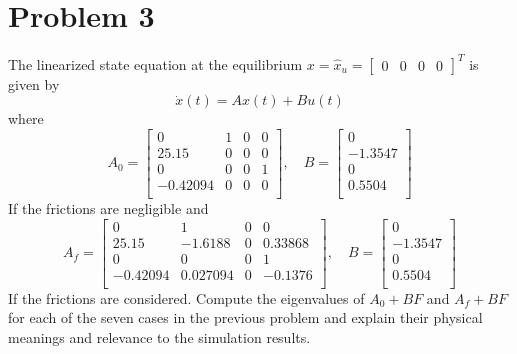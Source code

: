 \documentclass{article}
\begin{document}
\section*{Problem 3}
The linearized state equation at the equilibrium $ x = \hat{x}_u = \begin{bmatrix} 0 & 0 & 0 & 0 \end{bmatrix}^T$ is given by
$$ \dot{x}(t) = Ax(t) + Bu(t) $$
where
$$
A_0 =
\begin{bmatrix}
0 & 1 & 0 & 0 \\
25.15 & 0 & 0 & 0 \\
0 & 0 & 0 & 1 \\
-0.42094 & 0 & 0 & 0 \\
\end{bmatrix}
, \quad
B =
\begin{bmatrix}
0 \\
-1.3547 \\
0 \\
0.5504 \\
\end{bmatrix}
$$
If the frictions are negligible and
$$
A_f =
\begin{bmatrix}
0 & 1 & 0 & 0 \\
25.15 & -1.6188 & 0 & 0.33868 \\
0 & 0 & 0 & 1 \\
-0.42094 & 0.027094 & 0 & -0.1376 \\
\end{bmatrix}
, \quad
B =
\begin{bmatrix}
0 \\
-1.3547 \\
0 \\
0.5504 \\
\end{bmatrix}
$$
If the frictions are considered.
\newline
Compute the eigenvalues of $A_0 + BF$ and $A_f + BF$ for each of the seven cases in the previous problem and explain their physical meanings and relevance to the simulation results.
\newline
\newline
\end{document}
